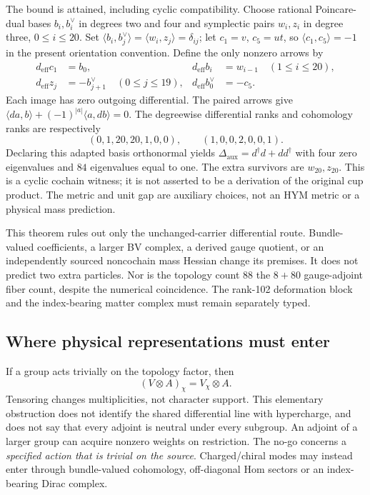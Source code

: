 \documentclass[11pt,a4paper]{article}
\begin{document}
The bound is attained, including cyclic compatibility. Choose rational
Poincare-dual bases \(b_i,b_i^\vee\) in degrees two and four and symplectic
pairs \(w_i,z_i\) in degree three, \(0\leq i\leq20\). Set
\(\langle b_i,b_j^\vee\rangle=\langle w_i,z_j\rangle=\delta_{ij}\);
let \(c_1=v\), \(c_5=ut\), so
\(\langle c_1,c_5\rangle=-1\) in the present orientation convention.
Define the only nonzero arrows by
\begin{align*}
 d_{\mathrm{eff}}c_1&=b_0,&
 d_{\mathrm{eff}}b_i&=w_{i-1}\quad(1\leq i\leq20),\\
 d_{\mathrm{eff}}z_j&=-b_{j+1}^\vee\quad(0\leq j\leq19),&
 d_{\mathrm{eff}}b_0^\vee&=-c_5 .
\end{align*}
Each image has zero outgoing differential. The paired arrows give
\(\langle da,b\rangle+(-1)^{|a|}\langle a,db\rangle=0\).
The degreewise differential ranks and cohomology ranks are respectively
\[
 (0,1,20,20,1,0,0),\qquad (1,0,0,2,0,0,1).
\]
Declaring this adapted basis orthonormal yields
\(\Delta_{\mathrm{aux}}=d^\dagger d+dd^\dagger\) with four zero
eigenvalues and \(84\) eigenvalues equal to one. The extra survivors are
\(w_{20},z_{20}\). This is a cyclic cochain witness; it is not asserted to
be a derivation of the original cup product. The metric and unit gap are
auxiliary choices, not an HYM metric or a physical mass prediction.

This theorem rules out only the unchanged-carrier differential route.
Bundle-valued coefficients, a larger BV complex, a derived gauge quotient,
or an independently sourced noncochain mass Hessian change its premises.
It does not predict two extra particles. Nor is the topology count \(88\)
the \(8+80\) gauge-adjoint fiber count, despite the numerical coincidence.
The rank-102 deformation block and the index-bearing matter complex must
remain separately typed.

\subsection{Where physical representations must enter}
\label{sec:bv-physical-bridge}

If a group acts trivially on the topology factor, then
\[
 (V\otimes A)_\chi=V_\chi\otimes A.
\]
Tensoring changes multiplicities, not character support. This elementary
obstruction does not identify the shared differential line with hypercharge,
and does not say that every adjoint is neutral under every subgroup.
An adjoint of a larger group can acquire nonzero weights on restriction.
The no-go concerns a \emph{specified action that is trivial on the source}.
Charged/chiral modes may instead enter through bundle-valued cohomology,
off-diagonal Hom sectors or an index-bearing Dirac complex.
\end{document}
